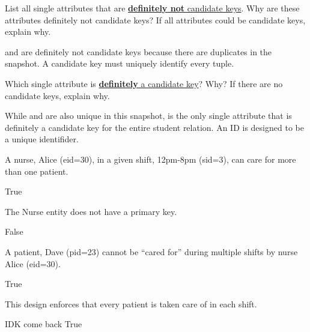 \documentclass[12pt, letterpaper]{article}
\begin{document}
{
\renewcommand{\stepsub}{
    \stepcounter{subproblemcounter}%
    \color{\TextColor}\arabic{subproblemcounter}.
}
\setcounter{subproblemcounter}{4}
\begin{subproblem}{}
    List all single attributes that are \underline{\textbf{definitely not} candidate keys}. Why are these attributes
definitely not candidate keys? If all attributes could be candidate keys, explain why.
\end{subproblem}
\begin{solution}
     and  are definitely not candidate keys because there are duplicates in the snapshot. A candidate
    key must uniquely identify every tuple.
\end{solution}

\begin{subproblem}{}
    Which single attribute is \underline{\textbf{definitely } a candidate key}? Why? If there are no candidate keys,
explain why.
\end{subproblem}
\begin{solution}
    While  and  are also unique in this snapshot,  is the only single attribute that is definitely a candidate key for the entire student relation. An ID is designed to be a unique identifider.
\end{solution}}

\qh
\begin{subproblem}{}
    A nurse, Alice (eid=30), in a given shift, 12pm-8pm (sid=3), can care for more than one
patient.
\end{subproblem}
\begin{solution}{}
    True
\end{solution}

\begin{subproblem}{}
    The Nurse entity does not have a primary key.
\end{subproblem}
\begin{solution}
    False
\end{solution}

\begin{subproblem}{}
    A patient, Dave (pid=23) cannot be “cared for” during multiple shifts by nurse Alice
(eid=30).
\end{subproblem}
\begin{solution}
    True
\end{solution}

\begin{subproblem}{}
    This design enforces that every patient is taken care of in each shift.
\end{subproblem}
\begin{solution}
    IDK come back True
\end{solution}
\end{document}

